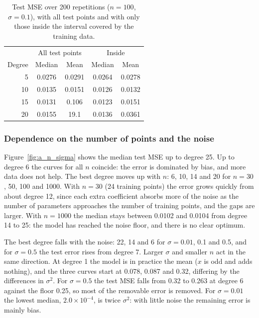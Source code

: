 \begin{table}
    \centering
    \caption{Test MSE over 200 repetitions ($n = 100$, $\sigma = 0.1$), with all test points and with only those inside the interval covered by the training data.}
    \label{tab:a_extrapolation}
    \begin{tabular}{rcccc}
        \toprule
        & \multicolumn{2}{c}{All test points} & \multicolumn{2}{c}{Inside} \\
        Degree & Median & Mean & Median & Mean \\
        \midrule
        5  & 0.0276 & 0.0291 & 0.0264 & 0.0278 \\
        10 & 0.0135 & 0.0151 & 0.0126 & 0.0132 \\
        15 & 0.0131 & 0.106  & 0.0123 & 0.0151 \\
        20 & 0.0155 & 19.1   & 0.0136 & 0.0361 \\
        \bottomrule
    \end{tabular}
\end{table}

\subsubsection{Dependence on the number of points and the noise}

Figure~\ref{fig:a_n_sigma} shows the median test MSE up to degree 25. Up to degree 6 the curves for all $n$ coincide: the error is dominated by bias, and more data does not help. The best degree moves up with $n$: 6, 10, 14 and 20 for $n = 30$, 50, 100 and 1000. With $n = 30$ (24 training points) the error grows quickly from about degree 12, since each extra coefficient absorbs more of the noise as the number of parameters approaches the number of training points, and the gaps are larger. With $n = 1000$ the median stays between 0.0102 and 0.0104 from degree 14 to 25: the model has reached the noise floor, and there is no clear optimum.

The best degree falls with the noise: 22, 14 and 6 for $\sigma = 0.01$, 0.1 and 0.5, and for $\sigma = 0.5$ the test error rises from degree 7. Larger $\sigma$ and smaller $n$ act in the same direction. At degree 1 the model is in practice the mean ($x$ is odd and adds nothing), and the three curves start at 0.078, 0.087 and 0.32, differing by the differences in $\sigma^2$. For $\sigma = 0.5$ the test MSE falls from 0.32 to 0.263 at degree 6 against the floor 0.25, so most of the removable error is removed. For $\sigma = 0.01$ the lowest median, $2.0\times10^{-4}$, is twice $\sigma^2$: with little noise the remaining error is mainly bias.

